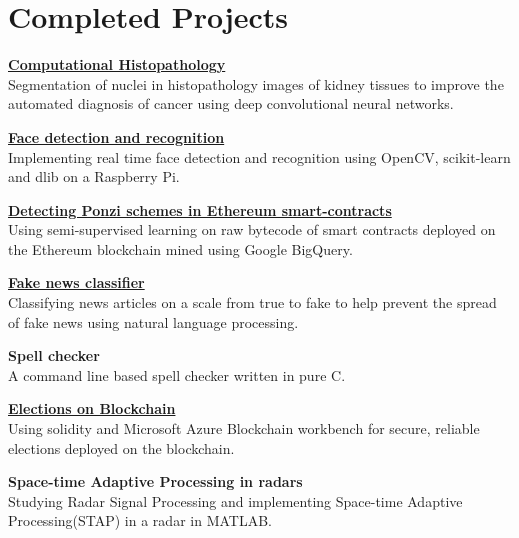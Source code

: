 \documentclass[letterpaper]{article}
\renewenvironment{itemize}{
  \begin{list}{}{
    \setlength{\leftmargin}{1.5em}
  }
}{
  \end{list}
}
\begin{document}
\section*{Completed Projects}
  \begin{itemize}
    \item
    \href{https://github.com/rshwndsz/nuclei-segmentation}{\textbf{Computational Histopathology}}\\
    Segmentation of nuclei in histopathology images of kidney tissues to improve the automated diagnosis of cancer using deep convolutional neural networks.

    \item
    \href{https://github.com/rshwndsz/face-net}{\textbf{Face detection and recognition}}\\
    Implementing real time face detection and recognition using OpenCV, scikit-learn and dlib on a Raspberry Pi.

    \item
    \href{https://github.com/rshwndsz/ponzi-detector}{\textbf{Detecting Ponzi schemes in Ethereum smart-contracts}}\\
    Using semi-supervised learning on raw bytecode of smart contracts deployed on the Ethereum blockchain mined using Google BigQuery.

    \item
    \href{https://github.com/rshwndsz/fake-news-classifier}{\textbf{Fake news classifier}}\\
    Classifying news articles on a scale from true to fake to help prevent the spread of fake news using natural language processing.

    \item
    \textbf{Spell checker}\\
    A command line based spell checker written in pure C.

    \item
    \href{https://github.com/rshwndsz/blockchain-elections}{\textbf{Elections on Blockchain}}\\
    Using solidity and Microsoft Azure Blockchain workbench for secure, reliable elections deployed on the blockchain.
  
    \item 
    \textbf{Space-time Adaptive Processing in radars}\\
    Studying Radar Signal Processing and implementing Space-time Adaptive Processing(STAP) in a radar in MATLAB.
  \end{itemize}
\end{document}
